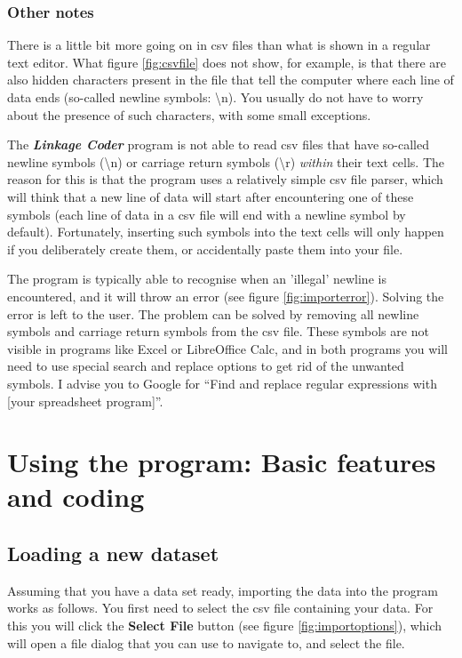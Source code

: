 \documentclass{memoir}
\begin{document}
\subsection{Other notes}
\label{sec:othernotesdatasets}

There is a little bit more going on in csv files than what is shown in a regular text editor. What figure \ref{fig:csvfile} does not show, for example, is that there are also hidden characters present in the file that tell the computer where each line of data ends (so-called newline symbols: \textbackslash n). You usually do not have to worry about the presence of such characters, with some small exceptions. 

The \emph{\textbf{Linkage Coder}} program is not able to read csv files that have so-called newline symbols (\textbackslash n) or carriage return symbols (\textbackslash r) \emph{within} their text cells. The reason for this is that the program uses a relatively simple csv file parser, which will think that a new line of data will start after encountering one of these symbols (each line of data in a csv file will end with a newline symbol by default). Fortunately, inserting such symbols into the text cells will only happen if you deliberately create them, or accidentally paste them into your file. 

The program is typically able to recognise when an 'illegal' newline is encountered, and it will throw an error (see figure \ref{fig:importerror}). Solving the error is left to the user. The problem can be solved by removing all newline symbols and carriage return symbols from the csv file. These symbols are not visible in programs like Excel or LibreOffice Calc, and in both programs you will need to use special search and replace options to get rid of the unwanted symbols. I advise you to Google for ``Find and replace regular expressions with [your spreadsheet program]''. 

\chapter{Using the program: Basic features and coding}
\label{chap:usingtheprogram}

\section{Loading a new dataset}
\label{sec:loadingnewdataset}

Assuming that you have a data set ready, importing the data into the program works as follows. You first need to select the csv file containing your data. For this you will click the \textbf{Select File} button (see figure \ref{fig:importoptions}), which will open a file dialog that you can use to navigate to, and select the file.
\end{document}
